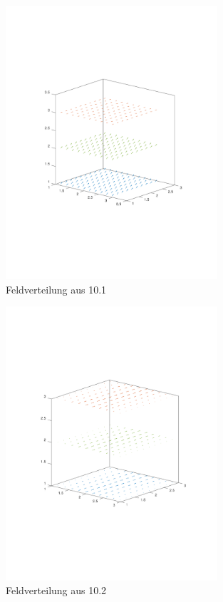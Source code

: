 \documentclass[Protokollheft.tex]{subfiles}
\begin{document}
	\begin{figure}[h]
	\centering
	\includegraphics[trim = 15mm 65mm 15mm 60mm, clip, width=0.7\textwidth]{10_1.pdf}
	\caption{Feldverteilung aus 10.1}
	\label{Abb:10_1}
\end{figure}
\begin{figure}[h]
	\centering
	\includegraphics[trim = 15mm 65mm 15mm 60mm, clip, width=0.7\textwidth]{10_2.pdf}
	\caption{Feldverteilung aus 10.2}
	\label{Abb:10_2}
\end{figure}
\end{document}
